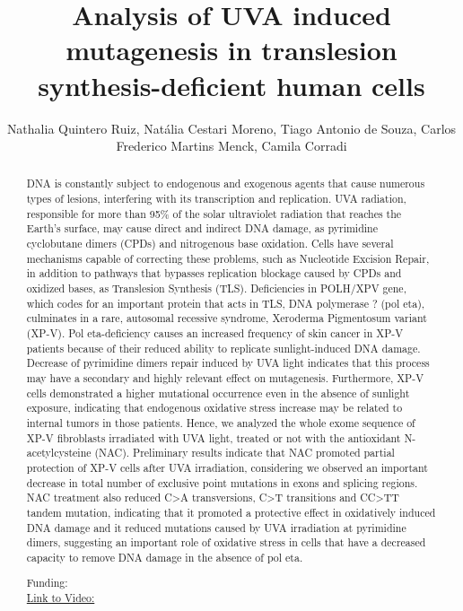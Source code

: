 \documentclass[twoside]{article}
\title{\vspace{-15mm}\fontsize{24pt}{10pt}\selectfont\textbf{ Analysis of UVA induced mutagenesis in translesion synthesis-deficient human cells }} %
\author{ Nathalia Quintero Ruiz,  Nat\'alia Cestari Moreno,  Tiago Antonio de Souza,  Carlos Frederico Martins Menck,  Camila Corradi }
\affil{ UNIVERSIDADE DE S\~AO PAULO }
\date{}
\begin{document}
  
  
  \maketitle %
  
  
  \thispagestyle{fancy} %
  
  
  \begin{abstract}
  DNA is constantly subject to endogenous and exogenous agents that cause numerous types of lesions,  interfering with its transcription and replication. UVA radiation,  responsible for more than 95\% of the solar ultraviolet radiation that reaches the Earth's surface,  may cause direct and indirect DNA damage,  as pyrimidine cyclobutane dimers (CPDs) and nitrogenous base oxidation. Cells have several mechanisms capable of correcting these problems,  such as Nucleotide Excision Repair,  in addition to pathways that bypasses replication blockage caused by CPDs and oxidized bases,  as Translesion Synthesis (TLS). Deficiencies in POLH/XPV gene,  which codes for an important protein that acts in TLS,  DNA polymerase ? (pol eta),  culminates in a rare,  autosomal recessive syndrome,  Xeroderma Pigmentosum variant (XP-V). Pol eta-deficiency causes an increased frequency of skin cancer in XP-V patients because of their reduced ability to replicate sunlight-induced DNA damage. Decrease of pyrimidine dimers repair induced by UVA light indicates that this process may have a secondary and highly relevant effect on mutagenesis. Furthermore,  XP-V cells demonstrated a higher mutational occurrence even in the absence of sunlight exposure,  indicating that endogenous oxidative stress increase may be related to internal tumors in those patients. Hence,  we analyzed the whole exome sequence of XP-V fibroblasts irradiated with UVA light,  treated or not with the antioxidant N-acetylcysteine (NAC). Preliminary results indicate that NAC promoted partial protection of XP-V cells after UVA irradiation,  considering we observed an important decrease in total number of exclusive point mutations in exons and splicing regions. NAC treatment also reduced C>A transversions,  C>T transitions and CC>TT tandem mutation,  indicating that it promoted a protective effect in oxidatively induced DNA damage and it reduced mutations caused by UVA irradiation at pyrimidine dimers,  suggesting an important role of oxidative stress in cells that have a decreased capacity to remove DNA damage in the absence of pol eta.
  
  Funding:   \\
  \href{http://ab3c.org.br/xpress_pres2020/xmxp2020-297956.html}{Link to Video:}

  \end{abstract}
   
  
\end{document}
